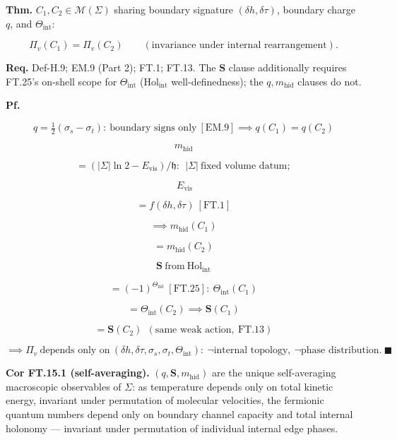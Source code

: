 \begin{theorem}\label{tag:FT-15}
\textbf{Thm.} $C_1,C_2\in\mathcal M(\Sigma)$ sharing boundary signature $(\delta h,\delta\tau)$, boundary charge $q$, and $\Theta_{\mathrm{int}}$:

\[
\Pi_v(C_1)=\Pi_v(C_2)\qquad(\text{invariance under internal rearrangement}).
\]

\textbf{Req.} Def-H.9; EM.9 (Part 2); FT.1; FT.13. The $\mathbf S$ clause additionally requires FT.25's on-shell scope for $\Theta_{\mathrm{int}}$ ($\mathrm{Hol}_{\mathrm{int}}$ well-definedness); the $q,m_{\mathrm{hid}}$ clauses do not.

\textbf{Pf.}

\[
q=\tfrac12(\sigma_s-\sigma_t):\ \text{boundary signs only}\ [\mathrm{EM.9}]\implies q(C_1)=q(C_2)
\]

\[
m_{\mathrm{hid}}
\]

\[
= (|\Sigma|\ln2-E_{\mathrm{vis}})/\mathfrak h:\ \ |\Sigma|\ \text{fixed volume datum};
\]

\[
\ E_{\mathrm{vis}}
\]

\[
= f(\delta h,\delta\tau)\ [\mathrm{FT.1}]
\]

\[
\implies m_{\mathrm{hid}}(C_1)
\]

\[
= m_{\mathrm{hid}}(C_2)
\]

\[
\mathbf S\ \text{from}\ \mathrm{Hol}_{\mathrm{int}}
\]

\[
= (-1)^{\Theta_{\mathrm{int}}}\ [\mathrm{FT.25}]:\ \Theta_{\mathrm{int}}(C_1)
\]

\[
= \Theta_{\mathrm{int}}(C_2)\implies\mathbf S(C_1)
\]

\[
= \mathbf S(C_2)\ \ (\text{same weak action},\ \mathrm{FT.13})
\]

\[
\implies\Pi_v\ \text{depends only on}\ (\delta h,\delta\tau,\sigma_s,\sigma_t,\Theta_{\mathrm{int}}):\ \neg\text{internal topology},\ \neg\text{phase distribution}.\ \blacksquare
\]

\textbf{Cor FT.15.1 (self-averaging).} $(q,\mathbf S,m_{\mathrm{hid}})$ are the unique self-averaging macroscopic observables of $\Sigma$: as temperature depends only on total kinetic energy, invariant under permutation of molecular velocities, the fermionic quantum numbers depend only on boundary channel capacity and total internal holonomy — invariant under permutation of individual internal edge phases.


\end{theorem}
